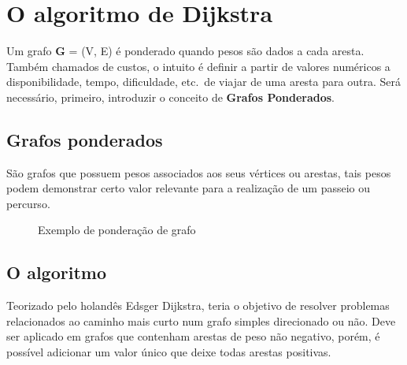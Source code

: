 \documentclass[a4paper, 12pt]{article}
\begin{document}
\section{O algoritmo de Dijkstra}
Um grafo \textbf{G} = (V, E) é ponderado quando pesos são dados a cada aresta. Também chamados de custos, o intuito é definir a partir de valores numéricos a disponibilidade, tempo, dificuldade, etc.\ de viajar de uma aresta para outra. Será necessário, primeiro, introduzir o conceito de \textbf{Grafos Ponderados}.
\subsection{Grafos ponderados}

São grafos que possuem pesos associados aos seus vértices ou arestas, tais pesos podem demonstrar certo valor relevante para a realização de um passeio ou percurso.

\begin{figure}[!hbt]
        \begin{center}
	    \caption{Exemplo de ponderação de grafo}

        \end{center}
    \end{figure}
    







\newpage
\subsection{O algoritmo}

Teorizado pelo holandês Edsger Dijkstra, teria o objetivo de resolver problemas relacionados ao caminho mais curto num grafo simples direcionado ou não. Deve ser aplicado em grafos que contenham arestas de peso não negativo, porém, é possível adicionar um valor único que deixe todas arestas positivas.
\end{document}
